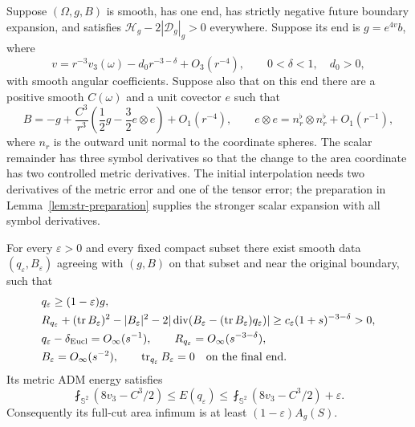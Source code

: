 \begin{proposition}
\label{str-bc-bending}
\label{prop:str-af-bending}
Suppose $(\Omega,g,B)$ is smooth, has one end, has strictly negative future
boundary expansion, and satisfies
$\mathcal H_g-2|\mathcal D_g|_g>0$ everywhere. Suppose its end is
$g=e^{4v}b$, where
\begin{equation}
 v=r^{-3}v_3(\omega)-d_0r^{-3-\delta}+O_3(r^{-4}),
 \qquad 0<\delta<1,\quad d_0>0,
 \label{str-bc-prepared-v}
\end{equation}
with smooth angular coefficients. Suppose also that on this end there are a
positive smooth $C(\omega)$ and a unit covector $e$ such that
\begin{equation}
 B=-g+\frac{C^3}{r^3}
       \left(\frac12g-\frac32e\otimes e\right)+O_1(r^{-4}),
 \qquad e\otimes e=n_r^\flat\otimes n_r^\flat+O_1(r^{-1}),
 \label{str-bc-prepared-B}
\end{equation}
where $n_r$ is the outward unit normal to the coordinate spheres.
The scalar remainder has three symbol derivatives so that the change to the
area coordinate has two controlled metric derivatives. The initial
interpolation needs two derivatives of the metric error and one of the
tensor error; the preparation in Lemma~\ref{lem:str-preparation} supplies
the stronger scalar expansion with all symbol derivatives.

For every $\varepsilon>0$ and every fixed compact subset there exist smooth
data $(q_\varepsilon,B_\varepsilon)$ agreeing with $(g,B)$ on that subset
and near the original boundary, such that
\begin{align}
 &q_\varepsilon\geq(1-\varepsilon)g,
 \label{str-bc-lower-comparison}\\
 &R_{q_\varepsilon}+(\operatorname{tr} B_\varepsilon)^2-|B_\varepsilon|^2
 -2|\operatorname{div}(B_\varepsilon-(\operatorname{tr} B_\varepsilon)q_\varepsilon)|
 \geq c_\varepsilon(1+s)^{-3-\delta}>0,
 \label{str-bc-strict-dec}\\
 &q_\varepsilon-\delta_{\mathrm{Eucl}}=O_\infty(s^{-1}),\qquad
 R_{q_\varepsilon}=O_\infty(s^{-3-\delta}),\nonumber\\
 &B_\varepsilon=O_\infty(s^{-2}),\qquad
 \operatorname{tr}_{q_\varepsilon}B_\varepsilon=0
 \quad\hbox{on the final end}.
 \label{str-bc-af-bounds}
\end{align}
Its metric ADM energy satisfies
\begin{equation}
 \fint_{\mathbb S^2}(8v_3-C^3/2)
 \leq E(q_\varepsilon)
 \leq\fint_{\mathbb S^2}(8v_3-C^3/2)+\varepsilon.
 \label{str-bc-energy}
\end{equation}
Consequently its full-cut area infimum is at least
$(1-\varepsilon)A_g(S)$.
\end{proposition}

